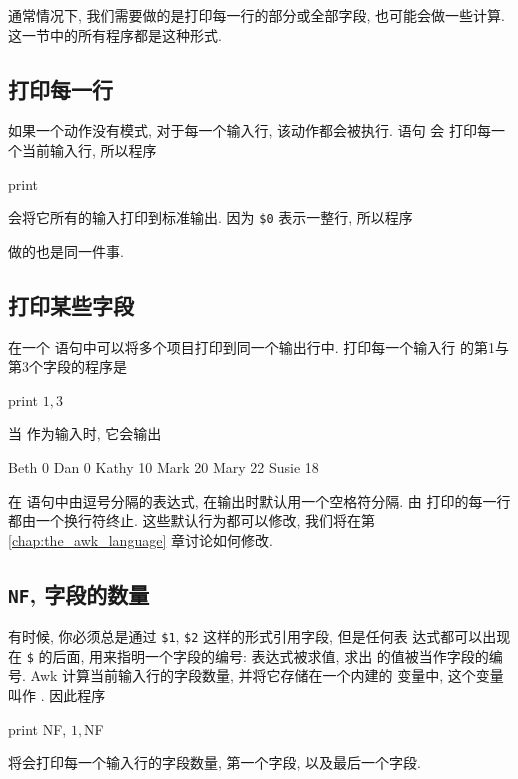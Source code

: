 通常情况下, 我们需要做的是打印每一行的部分或全部字段, 也可能会做一些计算.
这一节中的所有程序都是这种形式.

\subsection{打印每一行}
\label{subsec:printing_every_line}

如果一个动作没有模式, 对于每一个输入行, 该动作都会被执行. 语句 \print 会
打印每一个当前输入行, 所以程序
\begin{myverb}
    { print }
\end{myverb}
会将它所有的输入打印到标准输出. 因为 \verb'$0' 表示一整行, 所以程序
做的也是同一件事.

\subsection{打印某些字段}
\label{subsec:printing_certain_fields}

在一个 \print 语句中可以将多个项目打印到同一个输出行中. 打印每一个输入行
的第1与第3个字段的程序是
\begin{myverb}
    { print $1, $3 }
\end{myverb}
当  作为输入时, 它会输出
\begin{myverb}
    Beth 0
    Dan 0
    Kathy 10
    Mark 20
    Mary 22
    Susie 18
\end{myverb}
在 \print 语句中由逗号分隔的表达式, 在输出时默认用一个空格符分隔. 由
\print 打印的每一行都由一个换行符终止. 这些默认行为都可以修改, 我们将在第
\ref{chap:the_awk_language} 章讨论如何修改.

\subsection{\texttt{NF}, 字段的数量}
\label{subsec:nf_the_number_fields}

有时候, 你必须总是通过 \verb'$1', \verb'$2' 这样的形式引用字段, 但是任何表
达式都可以出现在 \verb'$' 的后面, 用来指明一个字段的编号: 表达式被求值, 求出
的值被当作字段的编号. Awk 计算当前输入行的字段数量, 并将它存储在一个内建的
变量中, 这个变量叫作 \nf. 因此程序
\begin{myverb}
    { print NF, $1, $NF }
\end{myverb}
将会打印每一个输入行的字段数量, 第一个字段, 以及最后一个字段.

